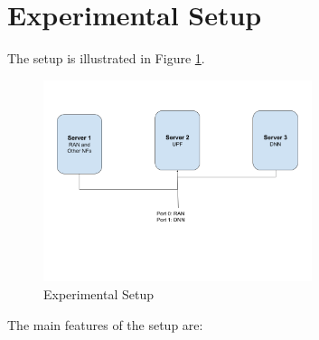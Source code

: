 
\section {Experimental Setup}
The setup is illustrated in Figure \ref{fig:ExperimentalSetup}.
\begin{figure}[htbp]
    \centering
    \includegraphics[width=0.7\textwidth, keepaspectratio]{./fig/Results/Setup.png}
    \caption{Experimental Setup}
    \label{fig:ExperimentalSetup}
\end{figure}
 The main features of the setup are: 

